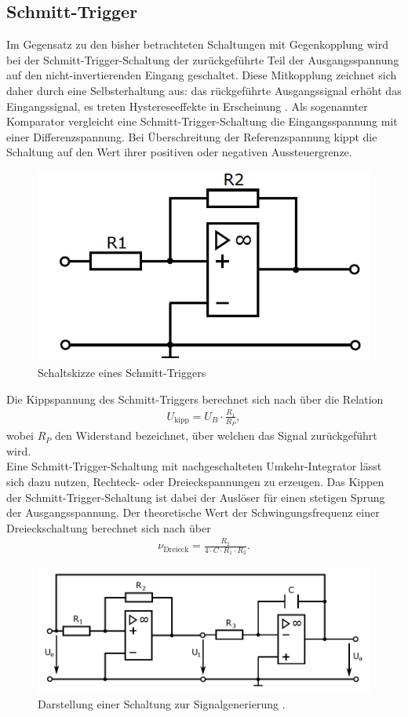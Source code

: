 \subsection{Schmitt-Trigger}
\noindent Im Gegensatz zu den bisher betrachteten Schaltungen mit Gegenkopplung
wird bei der Schmitt-Trigger-Schaltung der zurückgeführte Teil der
Ausgangsspannung auf den nicht-invertierenden Eingang geschaltet. Diese Mitkopplung
zeichnet sich daher durch eine Selbsterhaltung aus: das rückgeführte
Ausgangssignal erhöht das Eingangssignal, es treten Hystereseeffekte in
Erscheinung \cite{elektrotechnik}. Als sogenannter Komparator vergleicht eine
Schmitt-Trigger-Schaltung die Eingangsspannung mit einer Differenzspannung.
Bei Überschreitung der Referenzspannung kippt die Schaltung auf den Wert ihrer
positiven oder negativen Aussteuergrenze.
\begin{figure}
  \centering
  \includegraphics[scale=0.5]{ressources/figure_06.png}
  \caption{Schaltskizze eines Schmitt-Triggers \cite{sample}}
  \label{fig:06}
\end{figure}
\noindent Die Kippspannung des Schmitt-Triggers berechnet sich nach \cite{federau}
über die Relation
\begin{align}
  U_\text{kipp} = U_B \cdot \frac{R_1}{R_P},
  \label{eqn:09}
\end{align}
wobei $R_P$ den Widerstand bezeichnet, über welchen das Signal zurückgeführt
wird. \\
\noindent Eine Schmitt-Trigger-Schaltung mit nachgeschalteten Umkehr-Integrator
lässt sich dazu nutzen, Rechteck- oder Dreieckspannungen zu erzeugen.
Das Kippen der Schmitt-Trigger-Schaltung ist dabei der Auslöser für einen
stetigen Sprung der Ausgangsspannung. Der theoretische Wert der Schwingungsfrequenz
einer Dreieckschaltung berechnet sich nach \cite{sample} über
\begin{align}
  \nu_\text{Dreieck} = \frac{R_2}{4 \cdot C \cdot R_1 \cdot R_3}.
  \label{eqn:10}
\end{align}
\begin{figure}
  \centering
  \includegraphics{ressources/figure_07.png}
  \caption{Darstellung einer Schaltung zur Signalgenerierung \cite{sample}.}
  \label{fig:07}
\end{figure}
